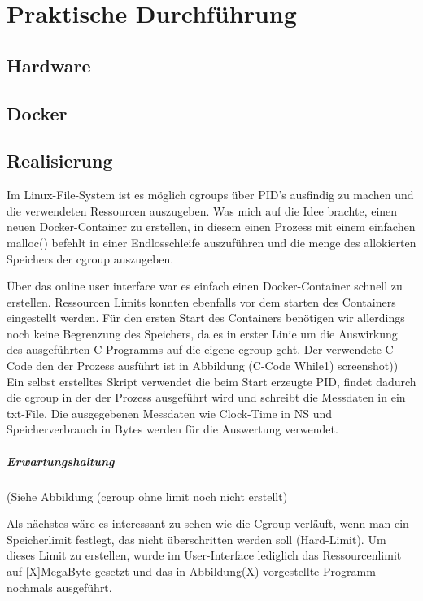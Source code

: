 \thispagestyle{empty}
\section{Praktische Durchführung}
\subsection{Hardware}
\subsection{Docker}
\subsection{Realisierung}
Im Linux-File-System ist es möglich cgroups über PID's ausfindig zu machen und die verwendeten Ressourcen auszugeben. Was mich auf die Idee brachte, einen neuen Docker-Container zu erstellen, in diesem einen Prozess mit einem einfachen malloc() befehlt in einer Endlosschleife auszuführen und die menge des allokierten Speichers der cgroup auszugeben. 

Über das online user interface war es einfach einen Docker-Container schnell zu erstellen. Ressourcen Limits konnten ebenfalls vor dem starten des Containers eingestellt werden. Für den ersten Start des Containers benötigen wir allerdings noch keine Begrenzung des Speichers, da es in erster Linie um die Auswirkung des ausgeführten C-Programms auf die eigene cgroup geht. Der verwendete C-Code den der Prozess ausführt ist in Abbildung (C-Code While1) screenshot)) Ein selbst erstelltes Skript verwendet die beim Start erzeugte PID, findet dadurch die cgroup in der der Prozess ausgeführt wird und schreibt die Messdaten in ein txt-File. Die ausgegebenen Messdaten wie Clock-Time in NS und Speicherverbrauch in Bytes werden für die Auswertung verwendet.

\subparagraph{Erwartungshaltung}

(Siehe Abbildung (cgroup ohne limit noch nicht erstellt)

Als nächstes wäre es interessant zu sehen wie die Cgroup verläuft, wenn man ein Speicherlimit festlegt, das nicht überschritten werden soll (Hard-Limit). Um dieses Limit zu erstellen, wurde im User-Interface lediglich das Ressourcenlimit auf [X]MegaByte gesetzt und das in Abbildung(X) vorgestellte Programm nochmals ausgeführt.

\pagebreak
